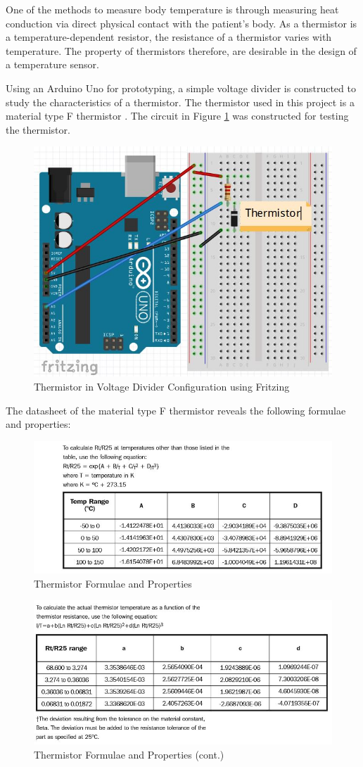 One of the methods to measure body temperature is through measuring heat conduction via direct physical contact with the patient's body. As a thermistor is a temperature-dependent resistor, the resistance of a thermistor varies with temperature. The property of thermistors therefore, are desirable in the design of a temperature sensor. 

Using an Arduino Uno for prototyping, a simple voltage divider is constructed to study the characteristics of a thermistor. The thermistor used in this project is a material type F thermistor \cite{thermistor}. The circuit in Figure \ref{temperaturefritzing1} was constructed for testing the thermistor. 

\begin{figure}[H]
	\centering
	\includegraphics[width=0.5\linewidth]{temperaturefritzing1.jpg}
	\caption{Thermistor in Voltage Divider Configuration using Fritzing}
	\label{temperaturefritzing1}
\end{figure}

The datasheet of the material type F thermistor \cite{thermistor} reveals the following formulae and properties: 

\begin{figure}[H]
	\centering
	\includegraphics[width=0.8\linewidth]{thermistordatasheet2.jpg}
	\caption{Thermistor Formulae and Properties \cite{thermistor}}
	\label{thermistordatasheet2}
\end{figure}

\begin{figure}[H]
	\centering
	\includegraphics[width=0.8\linewidth]{thermistordatasheet3.jpg}
	\caption{Thermistor Formulae and Properties (cont.) \cite{thermistor}}
	\label{thermistordatasheet3}
\end{figure}

